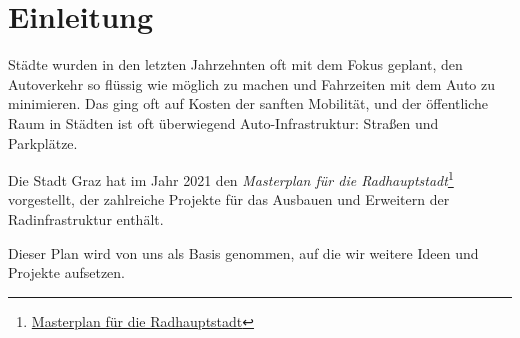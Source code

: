 \chapter{Einleitung}
Städte wurden in den letzten Jahrzehnten oft mit dem Fokus geplant, den Autoverkehr so flüssig wie möglich zu machen und Fahrzeiten mit dem Auto zu minimieren. Das ging oft auf Kosten der sanften Mobilität, und der öffentliche Raum in Städten ist oft überwiegend Auto-Infrastruktur: Straßen und Parkplätze.




Die Stadt Graz hat im Jahr 2021 den \emph{Masterplan für die Radhauptstadt}\footnote{\href{https://www.graz.at/cms/beitrag/10375678/8106610/Masterplan_fuer_die_Radhauptstadt.html}{Masterplan für die Radhauptstadt}} vorgestellt, der zahlreiche Projekte für das Ausbauen und Erweitern der Radinfrastruktur enthält.

Dieser Plan wird von uns als Basis genommen, auf die wir weitere Ideen und Projekte aufsetzen.